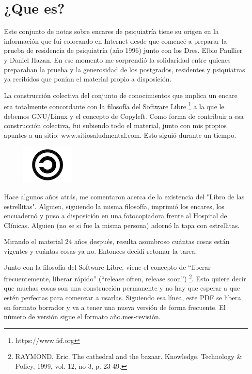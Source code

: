 \chapter{¿Que es?}
Este conjunto de notas sobre encares de psiquiatría tiene su origen en la información que fui colocando en Internet desde que comencé a preparar la prueba de residencia de psiquiatría (año 1996) junto con los Dres. Elbio Paullier y Daniel Hazan. En ese momento me sorprendió la solidaridad entre quienes preparaban la prueba y la generosidad de los postgrados, residentes y psiquiatras ya recibidos que ponían el material propio a disposición.

La construcción colectiva del conjunto de conocimientos que implica un encare era totalmente concordante con la filosofía del Software Libre \footnote{https://www.fsf.org} a la que le debemos GNU/Linux y el concepto de Copyleft. Como forma de contribuir a esa construcción colectiva, fui subiendo todo el material, junto con mis propios apuntes a un sitio: www.sitiosaludmental.com. Esto siguió durante un tiempo.
\begin{figure}
	\centering
	\includegraphics{copyleft.png}
\end{figure}
Hace algunos años atrás, me comentaron acerca de la existencia del "Libro de las estrellitas". Alguien, siguiendo la misma filosofía, imprimió los encares, los encuadernó y puso a disposición en una fotocopiadora frente al Hospital de Clínicas. Alguien (no se si fue la misma persona) adornó la tapa con estrellitas.

Mirando el material 24 años después, resulta asombroso cuántas cosas están vigentes y cuántas cosas ya no. Entonces decidí retomar la tarea.

Junto con la filosofía del Software Libre, viene el concepto de ``liberar frecuentemente, liberar rápido'' (``release often, release soon'') \footnote{RAYMOND, Eric. The cathedral and the bazaar. Knowledge, Technology \& Policy, 1999, vol. 12, no 3, p. 23-49.}. Esto quiere decir que muchas cosas son una construcción permanente y no hay que esperar a que estén perfectas para comenzar a usarlas. Siguiendo esa línea, este PDF se libera en formato borrador y va a tener una nueva versión de forma frecuente. El número de versión sigue el formato año.mes-revisión.

